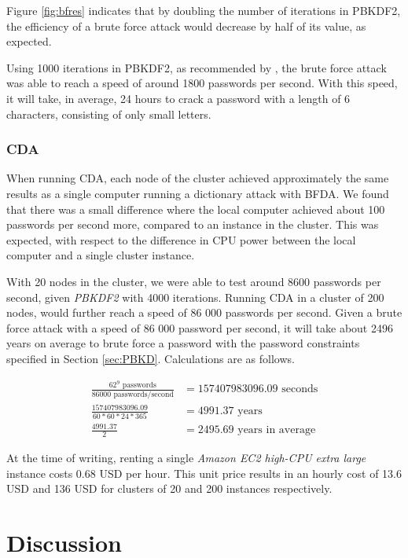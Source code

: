 \documentclass[pdftex,english,10pt,b5paper,twoside]{book}
\begin{document}
Figure \ref{fig:bfres} indicates that by doubling the number of iterations in
PBKDF2, the efficiency of a brute force attack would decrease by half of
its value, as expected.

Using 1000 iterations in \ac{PBKDF2}, as recommended by \citet{pbkdf2std}, the
brute force attack was able to reach a speed of around 1800 passwords per
second. With this speed, it will take, in average, 24 hours to crack a password
with a length of 6 characters, consisting of only small letters.

\subsection{\acl{CDA}}

When running \ac{CDA}, each node of the cluster achieved approximately the same
results as a single computer running a dictionary attack with \ac{BFDA}. We
found that there was a small difference where the local computer achieved about
100 passwords per second more, compared to an instance in the cluster. This was
expected, with respect to the difference in \ac{CPU} power between the local
computer and a single cluster instance. 

With 20 nodes in the cluster, we were able to test around 8600 passwords per
second, given \emph{PBKDF2} with 4000 iterations. Running \ac{CDA} in a cluster
of 200 nodes, would further reach a speed of 86 000 passwords per second. Given
a brute force attack with a speed of 86 000 password per second, it will take
about 2496 years on average to brute force a password with the password
constraints specified in Section \ref{sec:PBKD}. Calculations are as follows.

\begin{align*}
\frac{62^9 \text{ passwords}}{86000 \text{ passwords/second}} &= 157407983096.09 \text{ seconds} \\
\frac{157407983096.09}{60 * 60 * 24 * 365} &= 4991.37 \text{ years} \\
\frac{4991.37}{2} &= 2495.69 \text{ years in average}
\end{align*}

At the time of writing, renting a single \emph{Amazon EC2 high-CPU extra large}
instance costs 0.68 USD per hour. This unit price results in an hourly cost of
13.6 USD and 136 USD for clusters of 20 and 200 instances respectively. 

\chapter{Discussion}
\label{ch:discussion}
\end{document}
